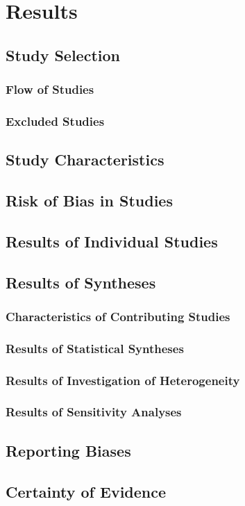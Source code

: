 \chapter{Results}
\label{chapterlabel4}

\section{Study Selection}

    \subsection{Flow of Studies}


    \subsection{Excluded Studies}
    

\section{Study Characteristics}


\section{Risk of Bias in Studies}


\section{Results of Individual Studies}


\section{Results of Syntheses}

    \subsection{Characteristics of Contributing Studies}


    \subsection{Results of Statistical Syntheses}


    \subsection{Results of Investigation of Heterogeneity}


    \subsection{Results of Sensitivity Analyses}


\section{Reporting Biases}


\section{Certainty of Evidence}